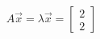 \documentclass[preview]{standalone}
\begin{document}
\begin{align*}
A\vec{x} = \lambda \vec{x} =  \begin{bmatrix} 2 \\ 2 \end{bmatrix}
\end{align*}
\end{document}
